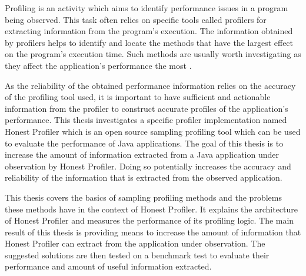 \documentclass[..thesis.tex]{subfiles}
\begin{document}
Profiling is an activity which aims to identify performance issues in a program being observed. This task often relies on specific tools called profilers for extracting information from the program's execution. The information obtained by profilers helps to identify and locate the methods that have the largest effect on the program's execution time. Such methods are usually worth investigating as they affect the application's performance the most \cite{mytkowicz_evaluating_2010}.


As the reliability of the obtained performance information relies on the accuracy of the profiling tool used, it is important to have sufficient and actionable information from the profiler to construct accurate profiles of the application's performance. This thesis investigates a specific profiler implementation named Honest Profiler which is an open source sampling profiling tool which can be used to evaluate the performance of Java applications. The goal of this thesis is to increase the amount of information extracted from a Java application under observation by Honest Profiler. Doing so potentially increases the accuracy and reliability of the information that is extracted from the observed application. 

This thesis covers the basics of sampling profiling methods and the problems these methods have in the context of Honest Profiler. It explains the architecture of Honest Profiler and measures the performance of its profiling logic. The main result of this thesis is providing means to increase the amount of information that Honest Profiler can extract from the application under observation. The suggested solutions are then tested on a benchmark test to evaluate their performance and amount of useful information extracted.

\end{document}
